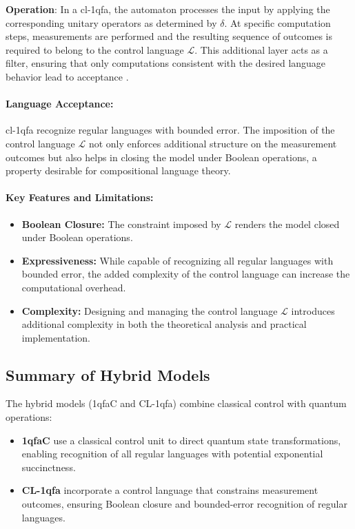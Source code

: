 \textbf{Operation}:  
In a \gls{cl-1qfa}, the automaton processes the input by applying the corresponding unitary operators as determined by \(\delta\). At specific computation steps, measurements are performed and the resulting sequence of outcomes is required to belong to the control language \( \mathcal{L} \). This additional layer acts as a filter, ensuring that only computations consistent with the desired language behavior lead to acceptance \cite{bertoni2003quantum}.

\paragraph{Language Acceptance:}  
\gls{cl-1qfa} recognize regular languages with bounded error. The imposition of the control language \( \mathcal{L} \) not only enforces additional structure on the measurement outcomes but also helps in closing the model under Boolean operations, a property desirable for compositional language theory.

\paragraph{Key Features and Limitations:}
\begin{itemize}
    \item \textbf{Boolean Closure:} The constraint imposed by \( \mathcal{L} \) renders the model closed under Boolean operations.
    \item \textbf{Expressiveness:} While capable of recognizing all regular languages with bounded error, the added complexity of the control language can increase the computational overhead.
    \item \textbf{Complexity:} Designing and managing the control language \( \mathcal{L} \) introduces additional complexity in both the theoretical analysis and practical implementation.
\end{itemize}

\subsection*{Summary of Hybrid Models}
The hybrid models (1qfaC and CL-1qfa) combine classical control with quantum operations:
\begin{itemize}
    \item \textbf{1qfaC} use a classical control unit to direct quantum state transformations, enabling recognition of all regular languages with potential exponential succinctness.
    \item \textbf{CL-1qfa} incorporate a control language that constrains measurement outcomes, ensuring Boolean closure and bounded-error recognition of regular languages.
\end{itemize}

